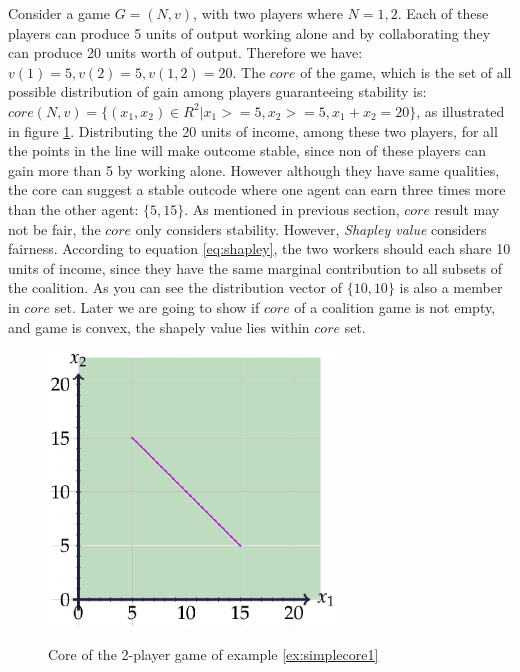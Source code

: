 
            \begin{example}\label{ex:simplecore1}
                Consider a game $G = (N, v)$, with two players where $N = {1,2}$. Each of these players can produce 5 units of output working alone and by collaborating they can produce 20 units worth of output. Therefore we have: $v({1}) = 5, v({2}) = 5, v({1,2}) = 20$. The $core$ of the game, which is the set of all possible distribution of gain among players guaranteeing stability is: $core(N,v) = \{(x_1,x_2) \in R^2 | x_1 >= 5, x_2 >= 5, x_1 + x_2 = 20\}$, as illustrated in figure \ref{fig:coreex1}. Distributing the 20 units of income, among these two players, for all the points in the line will make outcome stable, since non of these players can gain more than 5 by working alone. However although they have same qualities, the core can suggest a stable outcode where one agent can earn three times more than the other agent: $\{5,15\}$. As mentioned in previous section, $core$ result may not be fair, the $core$ only considers stability. However, \emph{Shapley value} considers fairness. According to equation \ref{eq:shapley}, the two  workers should each share 10 units of income, since they have the same marginal contribution to all subsets of the coalition. As you can see the distribution vector of $\{10,10\}$ is also a member in $core$ set. Later we are going to show if $core$ of a coalition game is not empty, and game is convex, the shapely value lies within $core$ set.
            \end{example}

            \begin{figure}
                \begin{center}
                \includegraphics[width=3in]{Figures/excore.eps}\label{fig:coreex1}
                \caption{Core of the 2-player game of example \ref{ex:simplecore1}}
                \end{center}
            \end{figure}


